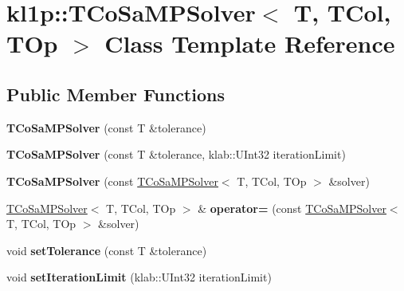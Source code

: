 \hypertarget{classkl1p_1_1TCoSaMPSolver}{}\section{kl1p\+:\+:T\+Co\+Sa\+M\+P\+Solver$<$ T, T\+Col, T\+Op $>$ Class Template Reference}
\label{classkl1p_1_1TCoSaMPSolver}
\subsection*{Public Member Functions}
\begin{DoxyCompactItemize}
\item 
{\bfseries T\+Co\+Sa\+M\+P\+Solver} (const T \&tolerance)\hypertarget{classkl1p_1_1TCoSaMPSolver_a96348b5e1705e769b89ff597cc3cad1a}{}\label{classkl1p_1_1TCoSaMPSolver_a96348b5e1705e769b89ff597cc3cad1a}

\item 
{\bfseries T\+Co\+Sa\+M\+P\+Solver} (const T \&tolerance, klab\+::\+U\+Int32 iteration\+Limit)\hypertarget{classkl1p_1_1TCoSaMPSolver_a8dea5f283ce6621aefbea6cb2098d2ab}{}\label{classkl1p_1_1TCoSaMPSolver_a8dea5f283ce6621aefbea6cb2098d2ab}

\item 
{\bfseries T\+Co\+Sa\+M\+P\+Solver} (const \hyperlink{classkl1p_1_1TCoSaMPSolver}{T\+Co\+Sa\+M\+P\+Solver}$<$ T, T\+Col, T\+Op $>$ \&solver)\hypertarget{classkl1p_1_1TCoSaMPSolver_a7b233b7ef70677ded371e086e412062b}{}\label{classkl1p_1_1TCoSaMPSolver_a7b233b7ef70677ded371e086e412062b}

\item 
\hyperlink{classkl1p_1_1TCoSaMPSolver}{T\+Co\+Sa\+M\+P\+Solver}$<$ T, T\+Col, T\+Op $>$ \& {\bfseries operator=} (const \hyperlink{classkl1p_1_1TCoSaMPSolver}{T\+Co\+Sa\+M\+P\+Solver}$<$ T, T\+Col, T\+Op $>$ \&solver)\hypertarget{classkl1p_1_1TCoSaMPSolver_aa14d917f7f5b58cf4ce5593b5e9ea878}{}\label{classkl1p_1_1TCoSaMPSolver_aa14d917f7f5b58cf4ce5593b5e9ea878}

\item 
void {\bfseries set\+Tolerance} (const T \&tolerance)\hypertarget{classkl1p_1_1TCoSaMPSolver_a2cdebf94c66ff131e2618d2b3a1a0cc1}{}\label{classkl1p_1_1TCoSaMPSolver_a2cdebf94c66ff131e2618d2b3a1a0cc1}

\item 
void {\bfseries set\+Iteration\+Limit} (klab\+::\+U\+Int32 iteration\+Limit)\hypertarget{classkl1p_1_1TCoSaMPSolver_ab83a99eb5ad90197b0398584a080340a}{}\label{classkl1p_1_1TCoSaMPSolver_ab83a99eb5ad90197b0398584a080340a}


\end{DoxyCompactItemize}
